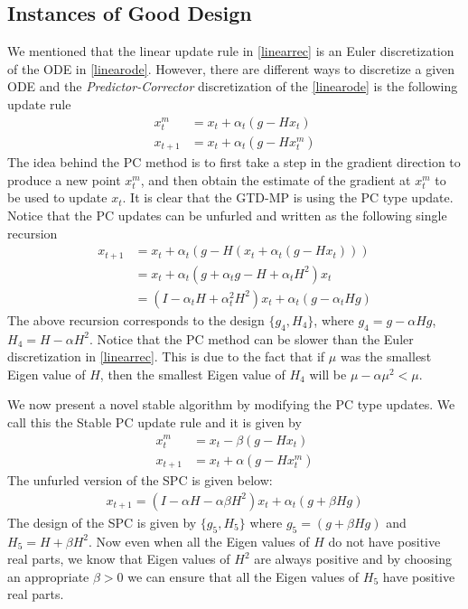 \subsection{Instances of Good Design}
We mentioned that the linear update rule in \eqref{linearrec} is an Euler discretization of the ODE in \eqref{linearode}. However, there are different ways to discretize a given ODE and the \emph{Predictor-Corrector} discretization of the \eqref{linearode} is the following update rule
\begin{align}
x^m_{t}&=x_t+\alpha_t(g-Hx_t)\\
x_{t+1}&=x_t+\alpha_t(g-Hx^m_t)
\end{align} 
The idea behind the PC method is to first take a step in the gradient direction to produce a new point $x^m_t$, and then obtain the estimate of the gradient at $x^m_t$ to be used to update $x_t$. It is clear that the GTD-MP is using the PC type update. Notice that the PC updates can be unfurled and written as the following single recursion
\begin{align}
x_{t+1}&=x_t+\alpha_t(g-H(x_t+\alpha_t(g-Hx_t)))\\
&=x_t+\alpha_t(g+\alpha_t g- H +\alpha_t H^2)x_t \\
&= (I-\alpha_t H+\alpha_t^2 H^2)x_t+\alpha_t(g-\alpha_t H g)
\end{align}
The above recursion corresponds to the design $\{g_4,H_4\}$, where $g_4=g-\alpha Hg$, $H_4=H-\alpha H^2$. Notice that the PC method can be slower than the Euler discretization in \eqref{linearrec}. This is due to the fact that if $\mu$ was the smallest Eigen value of $H$, then the smallest Eigen value of $H_4$ will be $\mu-\alpha \mu^2<\mu$.\par
We now present a novel stable algorithm by modifying the PC type updates. We call this the Stable PC update rule and it is given by
\begin{align}\label{spa}
x^m_{t}&=x_t-\beta(g-Hx_t)\\
x_{t+1}&=x_t+\alpha(g-Hx^m_t)
\end{align} 
The unfurled version of the SPC is given below:
\begin{align}\label{}
x_{t+1}= (I-\alpha H-\alpha\beta H^2)x_t+\alpha_t(g+\beta H g)
\end{align}
The design of the SPC is given by $\{g_5,H_5\}$ where $g_5=(g+\beta H g)$ and $H_5=H+\beta H^2$. Now even when all the Eigen values of $H$ do not have positive real parts, we know that Eigen values of $H^2$ are always positive and by choosing an appropriate $\beta>0$ we can ensure that all the Eigen values of $H_5$ have positive real parts.
